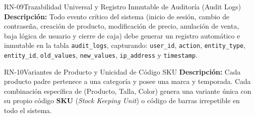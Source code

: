 \begin{rnbox}{RN-09}{Trazabilidad Universal y Registro Inmutable de Auditoría (Audit Logs)}
\textbf{Descripción:} Todo evento crítico del sistema (inicio de sesión, cambio de contraseña, creación de producto, modificación de precio, anulación de venta, baja lógica de usuario y cierre de caja) debe generar un registro automático e inmutable en la tabla \texttt{audit\_logs}, capturando: \texttt{user\_id}, \texttt{action}, \texttt{entity\_type}, \texttt{entity\_id}, \texttt{old\_values}, \texttt{new\_values}, \texttt{ip\_address} y \texttt{timestamp}.
\end{rnbox}

\begin{rnbox}{RN-10}{Variantes de Producto y Unicidad de Código SKU}
\textbf{Descripción:} Cada producto padre pertenece a una categoría y posee una marca y temporada. Cada combinación específica de (Producto, Talla, Color) genera una variante única con su propio código \textbf{SKU} (\textit{Stock Keeping Unit}) o código de barras irrepetible en todo el sistema.
\end{rnbox}
